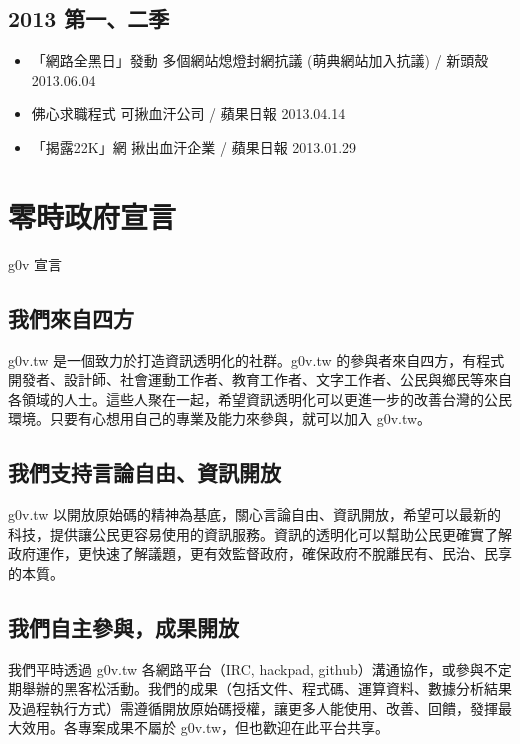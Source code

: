 \subsection{2013 第一、二季}

\begin{itemize}
\item 「網路全黑日」發動 多個網站熄燈封網抗議 (萌典網站加入抗議) / 新頭殼 2013.06.04
\item 佛心求職程式 可揪血汗公司 / 蘋果日報 2013.04.14
\item 「揭露22K」網 揪出血汗企業 / 蘋果日報 2013.01.29
\end{itemize}


\section{零時政府宣言}

g0v 宣言  

\subsection{我們來自四方}

g0v.tw 是一個致力於打造資訊透明化的社群。g0v.tw 的參與者來自四方，有程式開發者、設計師、社會運動工作者、教育工作者、文字工作者、公民與鄉民等來自各領域的人士。這些人聚在一起，希望資訊透明化可以更進一步的改善台灣的公民環境。只要有心想用自己的專業及能力來參與，就可以加入 g0v.tw。

\subsection{我們支持言論自由、資訊開放}

g0v.tw 以開放原始碼的精神為基底，關心言論自由、資訊開放，希望可以最新的科技，提供讓公民更容易使用的資訊服務。資訊的透明化可以幫助公民更確實了解政府運作，更快速了解議題，更有效監督政府，確保政府不脫離民有、民治、民享的本質。

\subsection{我們自主參與，成果開放}

我們平時透過 g0v.tw 各網路平台（IRC, hackpad, github）溝通協作，或參與不定期舉辦的黑客松活動。我們的成果（包括文件、程式碼、運算資料、數據分析結果及過程執行方式）需遵循開放原始碼授權，讓更多人能使用、改善、回饋，發揮最大效用。各專案成果不屬於 g0v.tw，但也歡迎在此平台共享。

